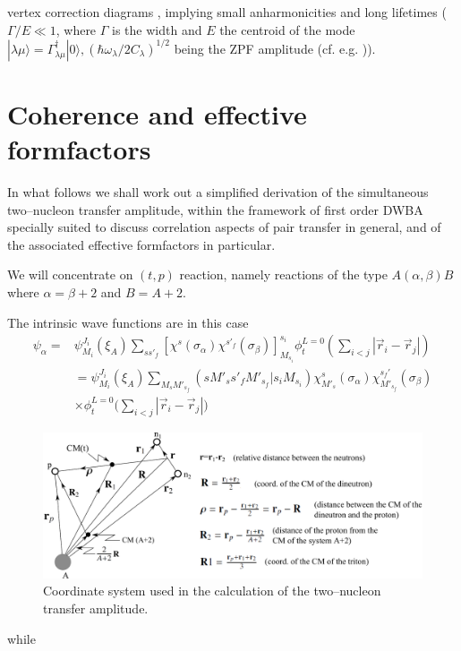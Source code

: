 \begin{subappendices}
vertex correction diagrams \citep{Bortignon:81}, implying small anharmonicities and long lifetimes ($\Gamma/E\ll1$, where $\Gamma$ is the width and $E$ the centroid of the mode $|\lambda\mu\rangle=\Gamma^\dagger_{\lambda\mu}|0\rangle, (\hbar\omega_\lambda/2C_\lambda)^{1/2}$ being the ZPF amplitude (cf. e.g. \cite{Brink:05})).
\section{Coherence and effective formfactors}\label{C7AppB}

In what follows we shall work out  a simplified derivation of the simultaneous two--nucleon transfer amplitude, within the framework of first order DWBA specially suited to discuss correlation aspects of pair transfer in general, and of the associated effective formfactors in particular. 


We will concentrate on $(t,p)$ reaction, namely reactions of the type $A(\alpha,\beta)B$ where $\alpha=\beta+2$ and $B=A+2$.


The intrinsic wave functions are in this case
\begin{equation}\label{5lec1}
\begin{split}
\psi_\alpha=& \psi_{M_i}^{J_i}(\xi_A) \sum_{s s'_f} \left[ \chi^s(\sigma_\alpha) \chi^{s'_f}(\sigma_\beta) \right] _{M_{s_i}}^{s_i}
\phi_t^{L=0}(\sum_{i<j}|\vec r_i-\vec r_j|)\\
&= \psi_{M_i}^{J_i}(\xi_A) \sum_{M_s M'_{s_f}} (s M'_{s} s'_f M'_{s_f}| s_i M_{s_i}) \chi^s_{M'_s}(\sigma_\alpha) \chi^{s_f'}_{M'_{s_f}}(\sigma_\beta)\\
& \times \phi_t^{L=0}\bigl(\sum_{i<j}|\vec r_i-\vec r_j|\bigr)
\end{split}
\end{equation}
 \begin{figure}[h!]
 	\begin{center}
\includegraphics*[width=\textwidth]{C7/figs_C7/coord}
\end{center}
\caption{Coordinate system used in the calculation of the two--nucleon transfer amplitude.}\label{fig_coord}
\end{figure}
while


\end{subappendices}
